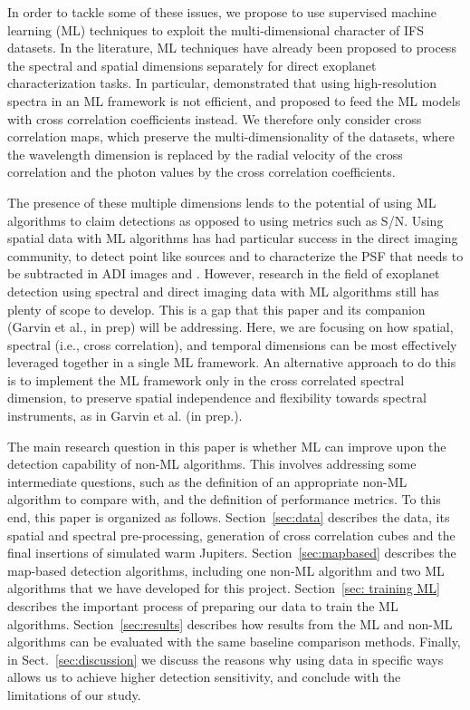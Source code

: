 \documentclass{aa}
\begin{document}
In order to tackle some of these issues, we propose to use supervised machine learning (ML) techniques to exploit the multi-dimensional character of IFS datasets. In the literature, ML techniques have already been proposed to process the spectral and spatial dimensions separately for direct exoplanet characterization tasks. In particular, \citet{2020Fisher} demonstrated that using high-resolution spectra in an ML framework is not efficient, and proposed to feed the ML models with cross correlation coefficients instead. 
We therefore only consider cross correlation maps, which preserve the multi-dimensionality of the datasets, where the wavelength dimension is replaced by the radial velocity of the cross correlation and the photon values by the cross correlation coefficients. 

The presence of these multiple dimensions lends to the potential of using ML algorithms to claim detections as opposed to using metrics such as S/N.
Using spatial data with ML algorithms has had particular success in the direct imaging community, to detect point like sources \cite{2018Gomez} and \cite{2023Carlito} to characterize the PSF that needs to be subtracted in ADI images \cite{2022Gebhard} and \cite{2023Flasseur}.
However, research in the field of exoplanet detection using spectral and direct imaging data with ML algorithms still has plenty of scope to develop. This is a gap that this paper and its companion (Garvin et al., in prep) will be addressing.
Here, we are focusing on how spatial, spectral (i.e., cross correlation), and temporal dimensions can be most effectively leveraged together in a single ML framework. 
An alternative approach to do this is to implement the ML framework only in the cross correlated spectral dimension, to preserve spatial independence and flexibility towards spectral instruments, as in Garvin et al. (in prep.).

The main research question in this paper is whether ML can improve upon the detection capability of non-ML algorithms. This involves addressing some intermediate questions, such as the definition of an appropriate non-ML algorithm to compare with, and the definition of performance metrics.
To this end, this paper is organized as follows. Section~\ref{sec:data} describes the data, its spatial and spectral pre-processing, generation of cross correlation cubes and the final insertions of simulated warm Jupiters.
Section~\ref{sec:mapbased} describes the map-based detection algorithms, including one non-ML algorithm and two ML algorithms that we have developed for this project.
Section~\ref{sec: training ML} describes the important process of preparing our data to train the ML algorithms.
Section~\ref{sec:results} describes how results from the ML and non-ML algorithms can be evaluated with the same baseline comparison methods.
Finally, in Sect.~\ref{sec:discussion} we discuss the reasons why using data in specific ways allows us to achieve higher detection sensitivity, and conclude with the limitations of our study.
\end{document}
